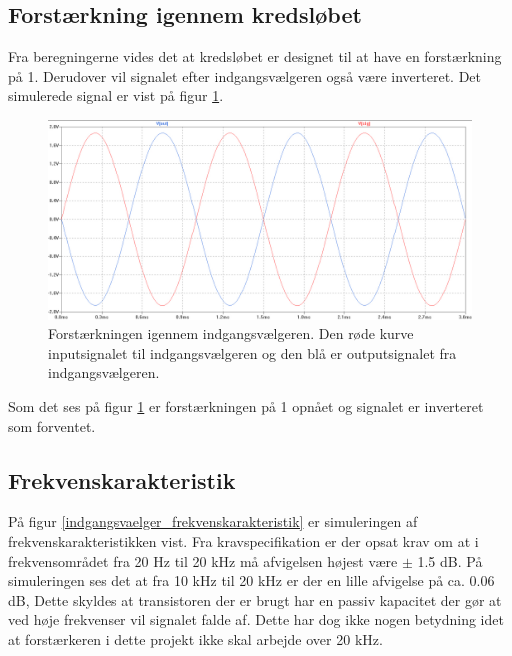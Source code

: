 \subsection*{Forstærkning igennem kredsløbet}
Fra beregningerne vides det at kredsløbet er designet til at have en forstærkning på 1. Derudover vil signalet efter indgangsvælgeren også være inverteret. Det simulerede signal er vist på figur \ref{indgangsvaelger_input/output}.
\begin{figure}[h]
\centering
\includegraphics[scale=0.3]{teknisk/indgangsvaelger/simulering/input_output.png}
\caption{Forstærkningen igennem indgangsvælgeren. Den røde kurve inputsignalet til indgangsvælgeren og den blå er outputsignalet fra indgangsvælgeren.}
\label{indgangsvaelger_input/output}
\end{figure}

Som det ses på figur \ref{indgangsvaelger_input/output} er forstærkningen på 1 opnået og signalet er inverteret som forventet.


\subsection*{Frekvenskarakteristik}
På figur \ref{indgangsvaelger_frekvenskarakteristik} er simuleringen af frekvenskarakteristikken vist. Fra kravspecifikation er der opsat krav om at i frekvensområdet fra 20 Hz til 20 kHz må afvigelsen højest være $\pm$ 1.5 dB. På simuleringen ses det at fra 10 kHz til 20 kHz er der en lille afvigelse på ca. 0.06 dB, Dette skyldes at transistoren der er brugt har en passiv kapacitet der gør at ved høje frekvenser vil signalet falde af. Dette har dog ikke nogen betydning idet at forstærkeren i dette projekt ikke skal arbejde over 20 kHz.

